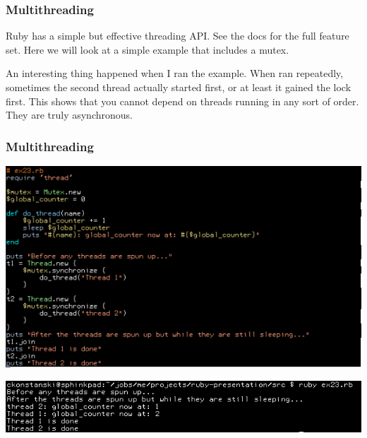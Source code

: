 \documentclass[helvetica,english,utf8,notitle,nologo]{beamer}
\begin{document}
\begin{frame}
  \frametitle{Multithreading}

  Ruby has a simple but effective threading API. See the docs for the
  full feature set. Here we will look at a simple example that
  includes a mutex.

  An interesting thing happened when I ran the example. When ran
  repeatedly, sometimes the second thread actually started first, or
  at least it gained the lock first. This shows that you cannot depend
  on threads running in any sort of order. They are truly
  asynchronous.
\end{frame}

\begin{frame}
  \frametitle{Multithreading}

  \includegraphics[scale=0.53]{src_23}

  \includegraphics[scale=0.5]{out_23}
\end{frame}
\end{document}
